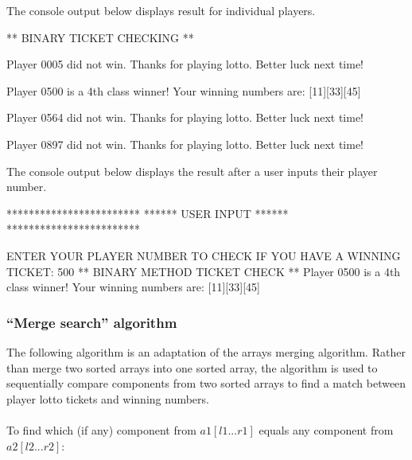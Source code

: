 \noindent
The console output below displays result for individual players.
\\
\begin{consolecode}
** BINARY TICKET CHECKING **

Player 0005 did not win. Thanks for playing lotto. 
Better luck next time!

Player 0500 is a 4th class winner!
Your winning numbers are: [11][33][45]

Player 0564 did not win. Thanks for playing lotto. 
Better luck next time!

Player 0897 did not win. Thanks for playing lotto. 
Better luck next time!
\end{consolecode}

\noindent
The console output below displays the result after a user inputs their player number.
\\
\begin{consolecode}
************************
****** USER INPUT ******
************************

ENTER YOUR PLAYER NUMBER TO CHECK IF YOU HAVE A WINNING TICKET:
500
** BINARY METHOD TICKET CHECK **
Player 0500 is a 4th class winner!
Your winning numbers are: [11][33][45]
\end{consolecode}

\newpage
\subsubsection{``Merge search'' algorithm}

The following algorithm is an adaptation of the arrays merging algorithm. Rather than merge two sorted arrays into one sorted array, the algorithm is used to sequentially compare components from two sorted arrays to find a match between player lotto tickets and winning numbers.
\\
\\
To find which (if any) component from $a1[l1...r1]$ equals any component from $a2[l2...r2]$:

